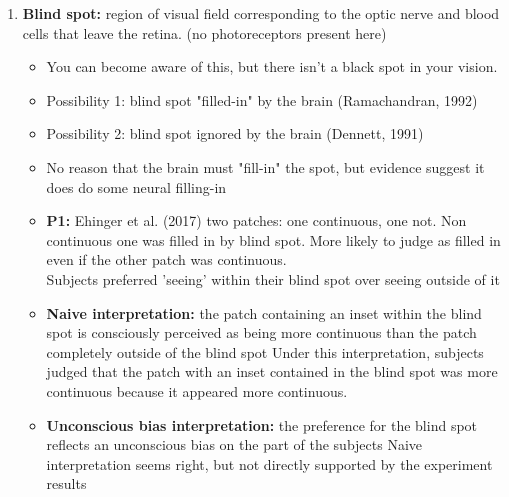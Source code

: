 \documentclass{article}
\begin{document}
\begin{enumerate}
    \item \textbf{Blind spot:} region of visual field corresponding to the optic nerve and blood cells that leave the retina. (no photoreceptors present here) 
    \begin{itemize}
        \item You can become aware of this, but there isn't a black spot in your vision. 
        \item Possibility 1: blind spot "filled-in" by the brain (Ramachandran, 1992)
        \item Possibility 2: blind spot ignored by the brain (Dennett, 1991)
        \item No reason that the brain must "fill-in" the spot, but evidence suggest it does do some neural filling-in
        \item \textbf{P1:} Ehinger et al. (2017) two patches: one continuous, one not. Non continuous one was filled in by blind spot. More likely to judge as filled in even if the other patch was continuous. \\
        Subjects preferred 'seeing' within their blind spot over seeing outside of it
        \item \textbf{Naive interpretation:} the patch containing an inset within the blind spot is consciously perceived as being more continuous than the patch completely outside of the blind spot
            \subitem Under this interpretation, subjects judged that the patch with an inset contained in the blind spot was more continuous because it appeared more continuous. 
        \item \textbf{Unconscious bias interpretation:} the preference for the blind spot reflects an unconscious bias on the part of the subjects
            \subitem Naive interpretation seems right, but not directly supported by the experiment results
    \end{itemize}
    

\end{enumerate}
\end{document}
